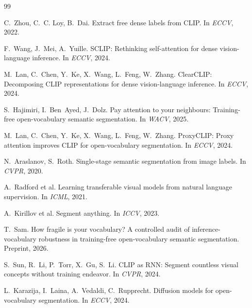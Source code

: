 \documentclass[11pt]{article}
\begin{document}

\begin{thebibliography}{99}

C.~Zhou, C.~C. Loy, B.~Dai.
\newblock Extract free dense labels from CLIP.
\newblock In \emph{ECCV}, 2022.

F.~Wang, J.~Mei, A.~Yuille.
\newblock SCLIP: Rethinking self-attention for dense vision-language inference.
\newblock In \emph{ECCV}, 2024.

M.~Lan, C.~Chen, Y.~Ke, X.~Wang, L.~Feng, W.~Zhang.
\newblock ClearCLIP: Decomposing CLIP representations for dense vision-language
  inference.
\newblock In \emph{ECCV}, 2024.

S.~Hajimiri, I.~Ben~Ayed, J.~Dolz.
\newblock Pay attention to your neighbours: Training-free open-vocabulary semantic
  segmentation.
\newblock In \emph{WACV}, 2025.

M.~Lan, C.~Chen, Y.~Ke, X.~Wang, L.~Feng, W.~Zhang.
\newblock ProxyCLIP: Proxy attention improves CLIP for open-vocabulary segmentation.
\newblock In \emph{ECCV}, 2024.

N.~Araslanov, S.~Roth.
\newblock Single-stage semantic segmentation from image labels.
\newblock In \emph{CVPR}, 2020.

A.~Radford et al.
\newblock Learning transferable visual models from natural language supervision.
\newblock In \emph{ICML}, 2021.

A.~Kirillov et al.
\newblock Segment anything.
\newblock In \emph{ICCV}, 2023.

T.~Sam.
\newblock How fragile is your vocabulary? A controlled audit of inference-vocabulary
  robustness in training-free open-vocabulary semantic segmentation.
\newblock Preprint, 2026.

S.~Sun, R.~Li, P.~Torr, X.~Gu, S.~Li.
\newblock CLIP as RNN: Segment countless visual concepts without training endeavor.
\newblock In \emph{CVPR}, 2024.

L.~Karazija, I.~Laina, A.~Vedaldi, C.~Rupprecht.
\newblock Diffusion models for open-vocabulary segmentation.
\newblock In \emph{ECCV}, 2024.


\end{thebibliography}
\end{document}
